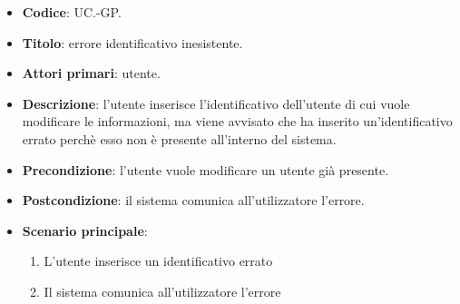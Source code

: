		\begin{itemize}
			\item \textbf{Codice}: UC\theuccount.\thesubuccount-GP.
			\item \textbf{Titolo}: errore identificativo inesistente.
			\item \textbf{Attori primari}: utente.
			\item \textbf{Descrizione}:  l’utente inserisce l'identificativo dell'utente di cui vuole modificare le informazioni, ma viene avvisato che ha inserito un'identificativo errato perchè esso non è presente all'interno del sistema.
			\item \textbf{Precondizione}: l'utente vuole modificare un utente già presente.
			\item \textbf{Postcondizione}: il sistema comunica all’utilizzatore l’errore.
			\item \textbf{Scenario principale}:
			\begin{enumerate}
				\item L'utente inserisce un identificativo errato 
				\item Il sistema comunica all’utilizzatore l’errore
			\end{enumerate}
		\end{itemize}